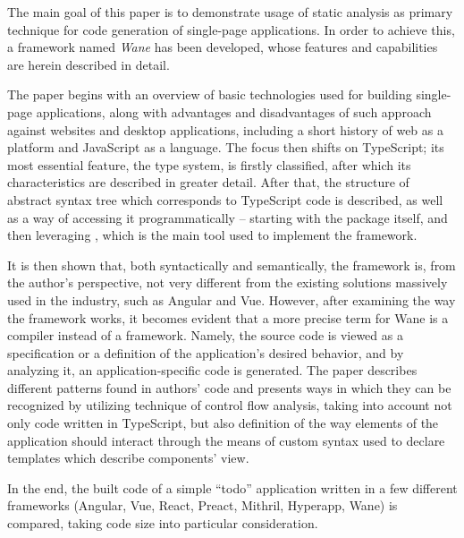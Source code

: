 The main goal of this paper is to demonstrate usage of static analysis as primary technique for code generation of single-page applications.
In order to achieve this, a framework named \textit{Wane} has been developed, whose features and capabilities are herein described in detail.

The paper begins with an overview of basic technologies used for building single-page applications, along with advantages and disadvantages of such approach against websites and desktop applications, including a short history of web as a platform and JavaScript as a language.
The focus then shifts on TypeScript; its most essential feature, the type system, is firstly classified, after which its characteristics are described in greater detail.
After that, the structure of abstract syntax tree which corresponds to TypeScript code is described, as well as a way of accessing it programmatically -- starting with the package  itself, and then leveraging , which is the main tool used to implement the framework.

It is then shown that, both syntactically and semantically, the framework is, from the author's perspective, not very different from the existing solutions massively used in the industry, such as Angular and Vue.
However, after examining the way the framework works, it becomes evident that a more precise term for Wane is a compiler instead of a framework.
Namely, the source code is viewed as a specification or a definition of the application's desired behavior, and by analyzing it, an application-specific code is generated.
The paper describes different patterns found in authors' code and presents ways in which they can be recognized by utilizing technique of control flow analysis, taking into account not only code written in TypeScript, but also definition of the way elements of the application should interact through the means of custom syntax used to declare templates which describe components' view.

In the end, the built code of a simple ``todo'' application written in a few different frameworks (Angular, Vue, React, Preact, Mithril, Hyperapp, Wane) is compared, taking code size into particular consideration.

